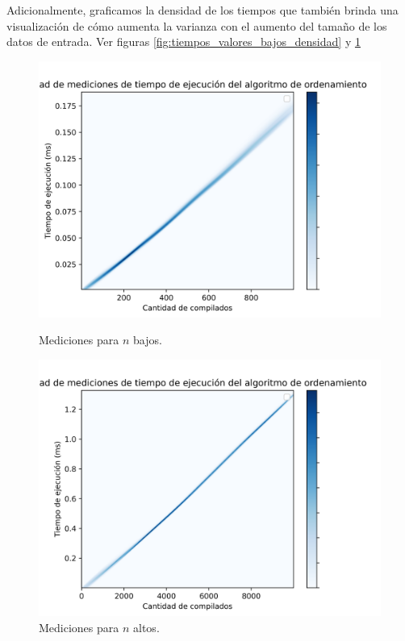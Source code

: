 Adicionalmente, graficamos la densidad de los tiempos que también brinda una visualización de cómo aumenta la varianza con el aumento del tamaño
de los datos de entrada. Ver figuras \ref{fig:tiempos_valores_bajos_densidad} y \ref{fig:tiempos_valores_altos_densidad} 

\begin{figure}[ht]
    \centering
    \begin{minipage}[b]{0.495\textwidth}
        \centering
        \includegraphics[width=\textwidth]{img/tiempos_valores_bajos_densidad.png}
        \caption{Mediciones para $n$ bajos.}
        \label{fig:tiempos_valores_bajos_densidad}
    \end{minipage}
    \begin{minipage}[b]{0.495\textwidth}
        \centering
        \includegraphics[width=\textwidth]{img/tiempos_valores_altos_densidad.png}
        \caption{Mediciones para $n$ altos.}
        \label{fig:tiempos_valores_altos_densidad}
    \end{minipage}
\end{figure}